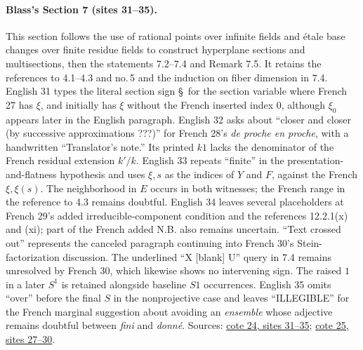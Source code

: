 \paragraph{Blass's Section 7 (sites 31--35).}
This section follows the use of rational points over infinite fields and étale base changes over finite residue fields to construct hyperplane sections and multisections, then the statements 7.2--7.4 and Remark 7.5. It retains the references to 4.1--4.3 and no.\,5 and the induction on fiber dimension in 7.4. English 31 types the literal section sign \S\ for the section variable where French 27 has $\xi$, and initially has $\xi$ without the French inserted index $0$, although $\xi_0$ appears later in the English paragraph. English 32 asks about ``closer and closer (by successive approximations ???)'' for French 28's \emph{de proche en proche}, with a handwritten ``Translator's note.'' Its printed $k1$ lacks the denominator of the French residual extension $k'/k$. English 33 repeats ``finite'' in the presentation-and-flatness hypothesis and uses $\xi,s$ as the indices of $Y$ and $F$, against the French $\xi,\xi(s)$. The neighborhood in $E$ occurs in both witnesses; the French range in the reference to 4.3 remains doubtful. English 34 leaves several placeholders at French 29's added irreducible-component condition and the references 12.2.1(x) and (xi); part of the French added N.B. also remains uncertain. ``Text crossed out'' represents the canceled paragraph continuing into French 30's Stein-factorization discussion. The underlined ``X [blank] U'' query in 7.4 remains unresolved by French 30, which likewise shows no intervening sign. The raised $1$ in a later $S^1$ is retained alongside baseline $S1$ occurrences. English 35 omits ``over'' before the final $S$ in the nonprojective case and leaves ``ILLEGIBLE'' for the French marginal suggestion about avoiding an \emph{ensemble} whose adjective remains doubtful between \emph{fini} and \emph{donné}. Sources: \href{https://grothendieck.umontpellier.fr/web/viewer.html?file=../24.pdf\#page=32}{cote 24, sites 31--35}; \href{https://grothendieck.umontpellier.fr/web/viewer.html?file=../25.pdf\#page=28}{cote 25, sites 27--30}.


